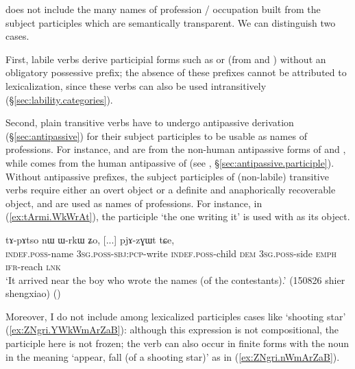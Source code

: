  does not include the many names of profession / occupation built from the subject participles which are semantically transparent. We can distinguish two cases. 

First, labile verbs derive participial forms such as  or  (from  and ) without an obligatory possessive prefix; the absence of these prefixes cannot be attributed to lexicalization, since these verbs can also be used intransitively (§\ref{sec:lability.categories}). 

Second, plain transitive verbs have to undergo antipassive derivation (§\ref{sec:antipassive}) for their subject participles to be usable as names of professions. For instance,  and  are from the  non-human antipassive forms of  and , while   comes from the  human antipassive of (see , §\ref{sec:antipassive.participle}). Without antipassive prefixes, the subject participles of (non-labile) transitive verbs require either an overt object or a definite and anaphorically recoverable object, and are used as names of professions. For instance, in (\ref{ex:tArmi.WkWrAt}), the participle  `the one writing it' is used with  as its object.

\begin{exe}
\ex \label{ex:tArmi.WkWrAt}
  tɤ-pɤtso nɯ ɯ-rkɯ ʑo, [...] pjɤ-zɣɯt tɕe, \\
 \textsc{indef}.\textsc{poss}-name \textsc{3sg}.\textsc{poss}-\textsc{sbj}:\textsc{pcp}-write  \textsc{indef}.\textsc{poss}-child \textsc{dem} \textsc{3sg}.\textsc{poss}-side \textsc{emph} { } \textsc{ifr}-reach \textsc{lnk} \\
\glt `It arrived near the boy who wrote the names (of the contestants).' (150826 shier shengxiao)
()
\end{exe}

Moreover, I do not include among lexicalized participles cases like `shooting star' (\ref{ex:ZNgri.YWkWmArZaB}): although this expression is not compositional, the participle here is not frozen; the verb  can also occur in finite forms with the noun  in the meaning `appear, fall (of a shooting star)' as in (\ref{ex:ZNgri.nWmArZaB}).

